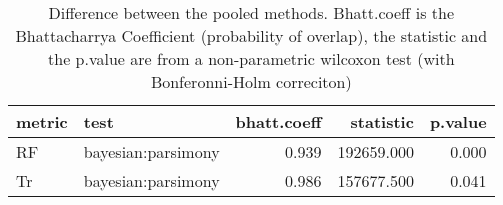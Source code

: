 \begin{table}[ht]
\centering
\begin{tabular}{llr|rr}
  \hline
metric & test & bhatt.coeff & statistic & p.value \\ 
  \hline
RF & bayesian:parsimony & 0.939 & 192659.000 & 0.000 \\ 
  Tr & bayesian:parsimony & 0.986 & 157677.500 & 0.041 \\ 
   \hline
\end{tabular}
\caption{Difference between the pooled methods. Bhatt.coeff is the Bhattacharrya Coefficient (probability of overlap), the statistic and the p.value are from a non-parametric wilcoxon test (with Bonferonni-Holm correciton)} 
\label{Tab_pooledsmethods_test}
\end{table}
